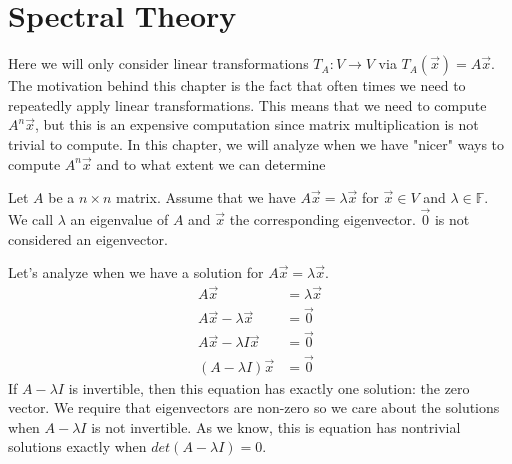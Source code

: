 \chapter{Spectral Theory}

Here we will only consider linear transformations $T_A:V\to V$ via $T_A(\vec{x})=A\vec{x}$. The motivation behind this chapter is the fact that often times we need to repeatedly apply linear transformations. This means that we need to compute $A^n\vec{x}$, but this is an expensive computation since matrix multiplication is not trivial to compute. In this chapter, we will analyze when we have "nicer" ways to compute $A^n\vec{x}$ and to what extent we can determine
\begin{definition}
    Let $A$ be a $n\times n$ matrix. Assume that we have $A\vec{x}=\lambda\vec{x}$ for $\vec{x}\in V$ and $\lambda\in\mathbb{F}$. We call $\lambda$ an eigenvalue of $A$ and $\vec{x}$ the corresponding eigenvector. $\vec{0}$ is not considered an eigenvector.
\end{definition}
Let's analyze when we have a solution for $A\vec{x}=\lambda\vec{x}$.
\begin{align*}
    A\vec{x}&=\lambda\vec{x}\\
    A\vec{x}-\lambda\vec{x}&=\vec{0}\\
    A\vec{x}-\lambda I\vec{x}&=\vec{0}\\
    (A-\lambda I)\vec{x}&=\vec{0}
\end{align*}
If $A-\lambda I$ is invertible, then this equation has exactly one solution: the zero vector. We require that eigenvectors are non-zero so we care about the solutions when $A-\lambda I$ is not invertible. As we know, this is equation has nontrivial solutions exactly when $det(A-\lambda I)=0$.
